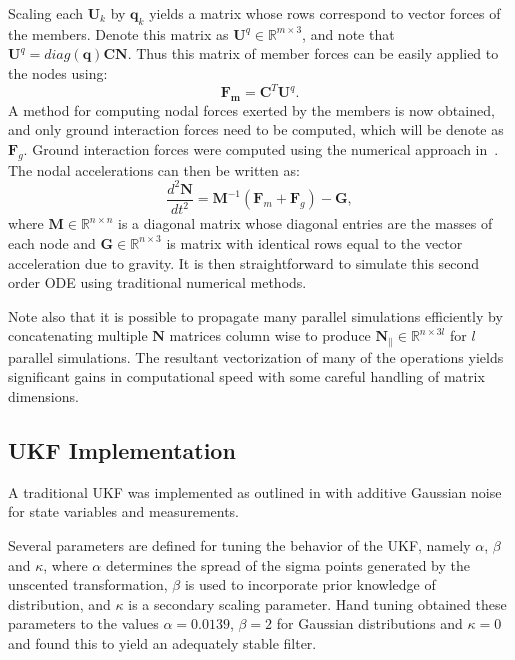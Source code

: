{Scaling each $\boldsymbol{U}_k$ by $\boldsymbol{q}_k$ yields a matrix whose rows correspond to vector forces of the members. 
Denote this matrix as $\boldsymbol{U}^q\in\mathbb{R}^{m\times 3}$, and note that $\boldsymbol{U}^q = diag(\boldsymbol{q}) \boldsymbol{C} \boldsymbol{N}$.
Thus this matrix of member forces can be easily applied to the nodes using:
$$
\boldsymbol{F_m} = \boldsymbol{C}^{T} \boldsymbol{U}^q.
$$
A method for computing nodal forces exerted by the members is now obtained, and only ground interaction forces need to be computed, which will be denote as $\boldsymbol{F}_g$.
Ground interaction forces were computed using the numerical approach in~\cite{yamane2006stable}. The nodal accelerations can then be written as:
$$
\frac{d^2\boldsymbol{N}}{dt^2} = \boldsymbol{M}^{-1}(\boldsymbol{F}_m+ \boldsymbol{F}_g) -  \boldsymbol{G},
$$
where $\boldsymbol{M}\in\mathbb{R}^{n\times n}$ is a diagonal matrix whose diagonal entries are the masses of each node and $\boldsymbol{G}\in\mathbb{R}^{n\times 3}$ is matrix with identical rows equal to the vector acceleration due to gravity. 
It is then straightforward to simulate this second order ODE using traditional numerical methods. 

Note also that it is possible to propagate many parallel simulations efficiently by concatenating multiple $\boldsymbol{N}$ matrices column wise to produce  $\boldsymbol{N}_{\parallel}\in\mathbb{R}^{n\times 3l}$ for $l$ parallel simulations.
The resultant vectorization of many of the operations yields significant gains in computational speed with some careful handling of matrix dimensions.   

\subsection{UKF Implementation}

A traditional UKF was implemented as outlined in \cite{wan2000unscented} with additive Gaussian noise for state variables and measurements.

Several parameters are defined for tuning the behavior of the UKF, namely $\alpha$, $\beta$ and $\kappa$, where $\alpha$ determines the spread of the sigma points generated by the unscented transformation, $\beta$ is used to incorporate prior knowledge of distribution, and $\kappa$ is a secondary scaling parameter.
Hand tuning obtained these parameters to the values $\alpha = 0.0139$, $\beta = 2$ for Gaussian distributions and $\kappa = 0$ and found this to yield an adequately stable filter.

}
